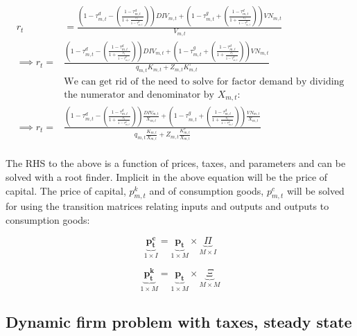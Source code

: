 \documentclass[letterpaper,12pt]{article}
\theoremstyle{definition}
\begin{document}
\begin{spacing}{1.5}
\begin{equation}
\begin{split}
r_{t} & = \frac{\left(1-\tau^{d}_{m,t}-\left(\frac{1-\tau^{d}_{m,t}}{1+\frac{r_{t}}{1-\tau^{g}_{m,t}}}\right)\right)DIV_{m,t} + \left(1-\tau^{g}_{m,t}+\left(\frac{1-\tau^{d}_{m,t}}{1+\frac{r_{t}}{1-\tau^{g}_{m,t}}}\right)\right)VN_{m,t}}{V_{m,t}}  \\
\implies r_{t} = &\frac{\left(1-\tau^{d}_{m,t}-\left(\frac{1-\tau^{d}_{m,t}}{1+\frac{r_{t}}{1-\tau^{g}_{m,t}}}\right)\right)DIV_{m,t} + \left(1-\tau^{g}_{m,t}+\left(\frac{1-\tau^{d}_{m,t}}{1+\frac{r_{t}}{1-\tau^{g}_{m,t}}}\right)\right)VN_{m,t}}{q_{m,t}K_{m,t} + Z_{m,t}K^{\tau}_{m,t}} \\
& \text{We can get rid of the need to solve for factor demand by dividing} \\ 
& \text{the numerator and denominator by $X_{m,t}$:} \\  
\implies r_{t} = &\frac{\left(1-\tau^{d}_{m,t}-\left(\frac{1-\tau^{d}_{m,t}}{1+\frac{r_{t}}{1-\tau^{g}_{m,t}}}\right)\right)\frac{DIV_{m,t}}{X_{m,t}} + \left(1-\tau^{g}_{m,t}+\left(\frac{1-\tau^{d}_{m,t}}{1+\frac{r_{t}}{1-\tau^{g}_{m,t}}}\right)\right)\frac{VN_{m,t}}{X_{m,t}}}{q_{m,t}\frac{K_{m,t}}{X_{m,t}} + Z_{m,t}\frac{K^{\tau}_{m,t}}{X_{m,t}}} \\
\end{split}
\end{equation}

The RHS to the above is a function of prices, taxes, and parameters and can be solved with a root finder. Implicit in the above equation will be the price of capital.  The price of capital, $p^{k}_{m,t}$ and of consumption goods, $p^{c}_{m,t}$ will be solved for using the transition matrices relating inputs and outputs and outputs to consumption goods:

\begin{equation}
\underbrace{\boldsymbol{p^{c}_{t}}}_{1\times I} =\underbrace{\boldsymbol{p_{t}}}_{1\times M} \times  \underbrace{\Pi}_{M\times I}
\end{equation}

\begin{equation}
\underbrace{\boldsymbol{p^{k}_{t}}}_{1\times M} =\underbrace{\boldsymbol{p_{t}}}_{1\times M} \times  \underbrace{\Xi}_{M\times M}
\end{equation}



\subsection*{Dynamic firm problem with taxes, steady state}


\end{spacing}
\end{document}
